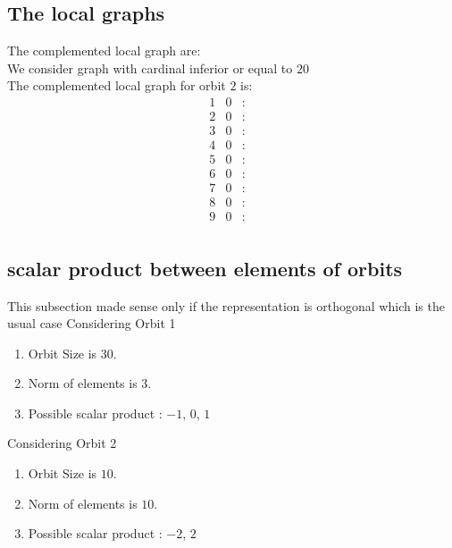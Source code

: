 \documentclass[12pt]{article}
\begin{document}
\subsection{The local graphs}
The complemented local graph are:\\
We consider graph with cardinal inferior or equal to $20$\\
The complemented local graph for orbit $2$ is:
\begin{equation*}
\begin{array}{rrcl}
1&0&:&\\
2&0&:&\\
3&0&:&\\
4&0&:&\\
5&0&:&\\
6&0&:&\\
7&0&:&\\
8&0&:&\\
9&0&:&\\
\end{array}
\end{equation*}
\subsection{scalar product between elements of orbits}
\noindent This subsection made sense only if the representation is orthogonal which is the usual case
Considering Orbit 1
\begin{enumerate}
\item Orbit Size is $30$.
\item Norm of elements is $3$.
\item Possible scalar product : $-1$, $0$, $1$
\end{enumerate}
Considering Orbit 2
\begin{enumerate}
\item Orbit Size is $10$.
\item Norm of elements is $10$.
\item Possible scalar product : $-2$, $2$
\end{enumerate}
\end{document}

